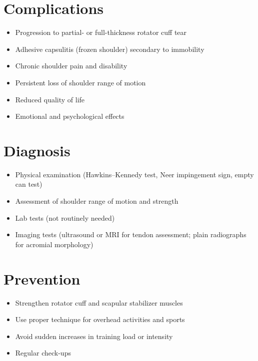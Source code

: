 \section{Complications}
\begin{itemize}[noitemsep]
  \item Progression to partial- or full-thickness rotator cuff tear
  \item Adhesive capsulitis (frozen shoulder) secondary to immobility
  \item Chronic shoulder pain and disability
  \item Persistent loss of shoulder range of motion
  \item Reduced quality of life
  \item Emotional and psychological effects
\end{itemize}

\section{Diagnosis}
\begin{itemize}[noitemsep]
  \item Physical examination (Hawkins--Kennedy test, Neer impingement sign, empty can test)
  \item Assessment of shoulder range of motion and strength
  \item Lab tests (not routinely needed)
  \item Imaging tests (ultrasound or MRI for tendon assessment; plain radiographs for acromial morphology)
\end{itemize}

\section{Prevention}
\begin{itemize}[noitemsep]
  \item Strengthen rotator cuff and scapular stabilizer muscles
  \item Use proper technique for overhead activities and sports
  \item Avoid sudden increases in training load or intensity
  \item Regular check-ups
\end{itemize}

